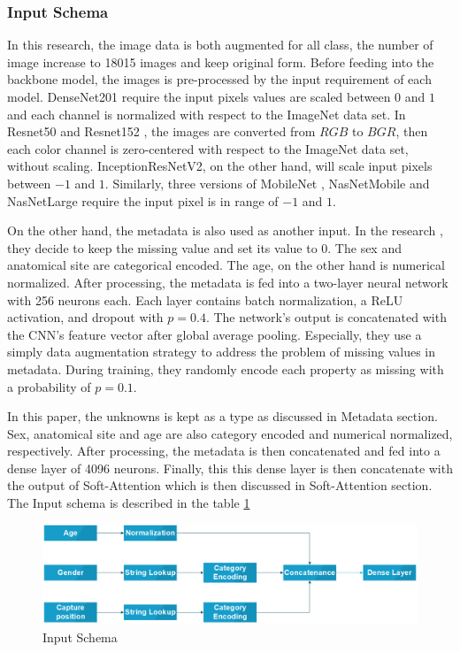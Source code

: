 \documentclass[sensors,article,submit,pdftex,moreauthors]{Definitions/mdpi}
\begin{document}
\subsubsection{Input Schema}
In this research, the image data is both augmented for all class, the number of image increase to 18015 images and keep original form. Before feeding into the backbone model, the images is pre-processed by the input requirement of each model. DenseNet201 \cite{06993} require the input pixels values are scaled between $0$ and $1$ and each channel is normalized with respect to the ImageNet data set. In Resnet50 and Resnet152 \cite{03385} \cite{05027}, the images are converted from $RGB$ to $BGR$, then each color channel is zero-centered with respect to the ImageNet data set, without scaling. InceptionResNetV2\cite{11946}, on the other hand, will scale input pixels between $-1$ and $1$. Similarly, three versions of MobileNet \cite{04861} \cite{04381} \cite{02244}, NasNetMobile and NasNetLarge \cite{07012} require the input pixel is in range of $-1$ and $1$. 

On the other hand, the metadata is also used as another input. In the research \cite{03910}, they decide to keep the missing value and set its value to $0$. The sex and anatomical site are categorical encoded. The age, on the other hand is numerical normalized. After processing, the metadata is fed into a two-layer neural network with 256 neurons each. Each layer contains batch normalization, a ReLU \cite{08375} activation, and dropout with $p = 0.4$. The network’s output is concatenated with the CNN’s feature vector after global average pooling. Especially, they use a simply data augmentation strategy to address the problem of missing values in metadata. During training, they randomly encode each property as missing with a probability of $p = 0.1$. 

In this paper, the unknowns is kept as a type as discussed in Metadata section. Sex, anatomical site and age are also category encoded and numerical normalized, respectively. After processing, the metadata is then concatenated and fed into a dense layer of 4096 neurons. Finally, this this dense layer is then concatenate with the output of Soft-Attention which is then discussed in Soft-Attention section. The Input schema is described in the table \ref{fig:input-schema}

\begin{figure}[H]
	\centering
	\includegraphics[width=1\linewidth]{"Definitions/Input Schema"}
	\caption{Input Schema}
	\label{fig:input-schema}
\end{figure}
\end{document}
